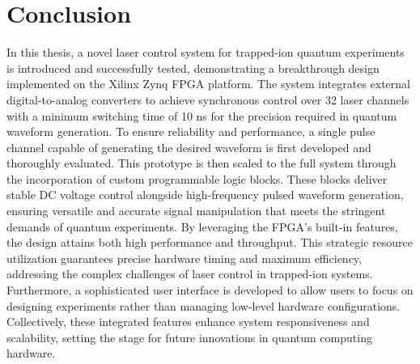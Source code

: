 \chapter{Conclusion}

In this thesis, a novel laser control system for trapped-ion quantum experiments is introduced and successfully tested, demonstrating a breakthrough design implemented on the Xilinx Zynq FPGA platform. The system integrates external digital-to-analog converters to achieve synchronous control over 32 laser channels with a minimum switching time of 10 ns for the precision required in quantum waveform generation. To ensure reliability and performance, a single pulse channel capable of generating the desired waveform is first developed and thoroughly evaluated. This prototype is then scaled to the full system through the incorporation of custom programmable logic blocks. These blocks deliver stable DC voltage control alongside high-frequency pulsed waveform generation, ensuring versatile and accurate signal manipulation that meets the stringent demands of quantum experiments. By leveraging the FPGA's built-in features, the design attains both high performance and throughput. This strategic resource utilization guarantees precise hardware timing and maximum efficiency, addressing the complex challenges of laser control in trapped-ion systems. Furthermore, a sophisticated user interface is developed to allow users to focus on designing experiments rather than managing low-level hardware configurations. Collectively, these integrated features enhance system responsiveness and scalability, setting the stage for future innovations in quantum computing hardware.